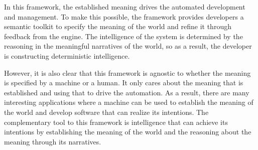 In this framework, the established meaning drives the automated development and management. To make this possible, the framework provides developers a semantic toolkit to specify the meaning of the world and refine it through feedback from the engine. The intelligence of the system is determined by the reasoning in the meaningful narratives of the world, so as a result, the developer is constructing deterministic intelligence.

However, it is also clear that this framework is agnostic to whether the meaning is specified by a machine or a human. It only cares about the meaning that is established and using that to drive the automation. As a result, there are many interesting applications where a machine can be used to establish the meaning of the world and develop software that can realize its intentions. The complementary tool to this framework is intelligence that can achieve its intentions by establishing the meaning of the world and the reasoning about the meaning through its narratives.